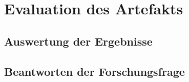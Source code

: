 \chapter{Evaluation des Artefakts}

\section{Auswertung der Ergebnisse}

\section{Beantworten der Forschungsfrage}
